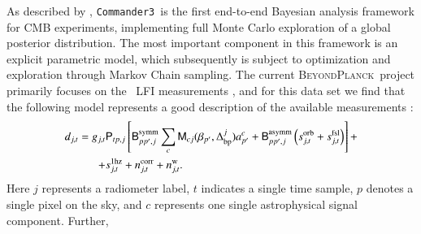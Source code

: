 \documentclass[twocolumn]{aa}
\def\commanderthree{\texttt{Commander3}}
\newcommand{\B}[0]{\tens{B}}
\newcommand{\M}[0]{\tens{M}}
\renewcommand{\P}[0]{\tens{P}}
\newcommand{\Dbp}[0]{\Delta_{\mathrm{bp}}}
\newcommand{\BP}{\textsc{BeyondPlanck}}
\begin{document}
As described by \citet{BP01}, \commanderthree\ is the first end-to-end
Bayesian analysis framework for CMB experiments, implementing full
Monte Carlo exploration of a global posterior distribution. The most
important component in this framework is an explicit parametric model,
which subsequently is subject to optimization and exploration through
Markov Chain sampling. The current \BP\ project primarily focuses on
the \Planck\ LFI measurements \citep{planck2016-l01,planck2016-l02},
and for this data set we find that the following model represents a
good description of the available measurements \citep{BP01}:
\begin{equation}
  \begin{split}
    d_{j,t} = g_{j,t}&\P_{tp,j}\left[ \B^{\mathrm{symm}}_{pp',j}\sum_{c}
      \M_{cj}(\beta_{p'}, \Dbp^{j})a^c_{p'}  + \B^{\mathrm{asymm}}_{pp',j}\left(s^{\mathrm{orb}}_{j,t}  
      + s^{\mathrm{fsl}}_{j,t}\right)\right] + \\
    + &s^{\mathrm{1hz}}_{j,t} + n^{\mathrm{corr}}_{j,t} + n^{\mathrm{w}}_{j,t}.
  \end{split}
  \label{eq:todmodel}
\end{equation}
Here $j$ represents a radiometer label, $t$ indicates a single
time sample, $p$ denotes a single pixel on the sky, and $c$ represents
one single astrophysical signal component. Further,
\end{document}
